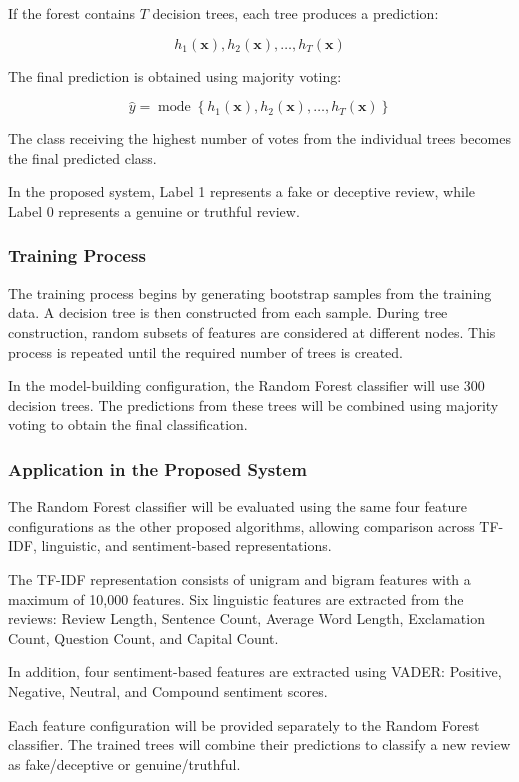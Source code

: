 \documentclass[12pt,a4paper]{report}
\begin{document}
If the forest contains \(T\) decision trees, each tree produces a prediction:

\[
h_1(\mathbf{x}),h_2(\mathbf{x}),\ldots,h_T(\mathbf{x})
\]

The final prediction is obtained using majority voting:

\[
\hat{y}
=
\operatorname{mode}
\left\{
h_1(\mathbf{x}),
h_2(\mathbf{x}),
\ldots,
h_T(\mathbf{x})
\right\}
\]

The class receiving the highest number of votes from the individual trees becomes the final predicted class.

In the proposed system, Label 1 represents a fake or deceptive review, while Label 0 represents a genuine or truthful review.

\subsubsection*{Training Process}

The training process begins by generating bootstrap samples from the training data. A decision tree is then constructed from each sample. During tree construction, random subsets of features are considered at different nodes. This process is repeated until the required number of trees is created.

In the model-building configuration, the Random Forest classifier will use 300 decision trees. The predictions from these trees will be combined using majority voting to obtain the final classification.

\subsubsection*{Application in the Proposed System}

The Random Forest classifier will be evaluated using the same four feature configurations as the other proposed algorithms, allowing comparison across TF-IDF, linguistic, and sentiment-based representations.

The TF-IDF representation consists of unigram and bigram features with a maximum of 10,000 features. Six linguistic features are extracted from the reviews: Review Length, Sentence Count, Average Word Length, Exclamation Count, Question Count, and Capital Count.

In addition, four sentiment-based features are extracted using VADER: Positive, Negative, Neutral, and Compound sentiment scores.

Each feature configuration will be provided separately to the Random Forest classifier. The trained trees will combine their predictions to classify a new review as fake/deceptive or genuine/truthful.
\end{document}
